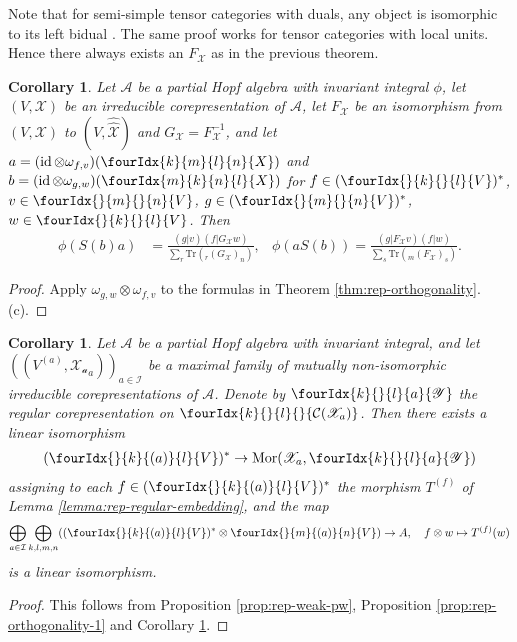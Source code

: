 \documentclass[10pt]{article}
\DeclareMathOperator{\id}{id}
\newcommand{\dual}[1]{#1^{*}}
\newcommand{\dualco}[1]{\hat{#1}}
\newcommand{\Tr}{\mathrm{Tr}}
\newcommand{\Mor}{\mathrm{Mor}}
\newcommand{\GrDA}[3]{{}_{#2}#1_{#3}} %
\newcommand{\Gr}[5]{\fourIdx{#2}{#4}{#3}{#5}{#1}}%
\newcommand{\Gru}[3]{\Gr{#1}{}{}{#2}{#3}}
\newcommand{\Grd}[3]{\Gr{#1}{#2}{#3}{}{}}
\newtheorem{Cor}[Theorem]{Corollary}
\theoremstyle{definition}
\numberwithin{equation}{section}
\begin{document}
Note that for semi-simple tensor categories with duals, any object is
isomorphic to its left bidual  \cite[Proposition
  2.1]{ENO1}. The same proof works for tensor categories with local units. Hence there always exists an $F_{\mathscr{X}}$ as in the previous theorem. 

\begin{Cor}\label{CorOrth}
  Let $\mathscr{A}$ be a %
partial Hopf algebra with invariant integral $\phi$, let
  $(V,\mathscr{X})$ be an irreducible corepresentation of
  $\mathscr{A}$, let $F_{\mathscr{X}}$ be an isomorphism from
  $(V,\mathscr{X})$ to $(V,\dualco{\dualco{\mathscr{X}}})$ and
  $G_{\mathscr{X}}=F^{-1}_{{\mathscr{X}}}$, and let $a=(\id \otimes
  \omega_{f,v})(\Gr{X}{k}{l}{m}{n})$ and $b=(\id \otimes
  \omega_{g,w})(\Gr{X}{m}{n}{k}{l})$ for
  $f \in   \dual{(\Gru{V}{k}{l})}$, $v \in\Gru{V}{m}{n}$, $g \in
  \dual{(\Gru{V}{m}{n})}$, $w \in  \Gru{V}{k}{l}$.  Then
\begin{align*}
  \phi(S(b)a) &= \frac{(g|v)(f|G_{\mathscr{X}}w)}{\sum_{r}
    \Tr(\GrDA{(G_{\mathscr{X}})}{r}{n})}, & \phi(aS(b)) = \frac{(g|F_{\mathscr{X}}v)(f|w)}{\sum_{s}
    \Tr(\GrDA{(F_{\mathscr{X}})}{m}{s})}.
\end{align*}
\end{Cor}
\begin{proof}
Apply $\omega_{g,w} \otimes
    \omega_{f,v}$ to the formulas in  Theorem
    \ref{thm:rep-orthogonality}.(c).
\end{proof}

\begin{Cor} \label{cor:rep-pw}
  Let $\mathscr{A}$ be a partial Hopf algebra with invariant integral, and let
  $((V^{(a)},\mathscr{X_{a}}_{a}))_{a \in \mathcal{I}}$ be a maximal family of mutually non-isomorphic irreducible corepresentations of
  $\mathscr{A}$. Denote by $\Gr{\mathscr{Y}}{k}{l}{}{a}$
  the regular corepresentation on
  $\Grd{\mathcal{C}(\mathscr{X}_a)}{k}{l}$. Then there exists a
  linear isomorphism
  \begin{align*}
    \dual{( \Gr{V}{}{(a)}{k}{l})} \to
    \Mor(\mathscr{X}_{a},
    \Gr{\mathscr{Y}}{k}{l}{}{a})
  \end{align*}
  assigning to each $f\in     \dual{( \Gr{V}{}{(a)}{k}{l})}$ the morphism
  $T^{(f)}$ of Lemma \ref{lemma:rep-regular-embedding}, and the map  
  \begin{align*}
    \bigoplus_{a \in \mathcal{I}} \bigoplus_{k,l,m,n}
    (\dual{(\Gr{V}{}{(a)}{k}{l})} \otimes
    \Gr{V}{}{(a)}{m}{n}) \to A,\quad f \otimes w \mapsto T^{(f)}(w)
  \end{align*}
  is a linear isomorphism. 
\end{Cor}
\begin{proof} This follows from Proposition \ref{prop:rep-weak-pw}, Proposition \ref{prop:rep-orthogonality-1} and Corollary \ref{CorOrth}.
\end{proof}
\end{document}

